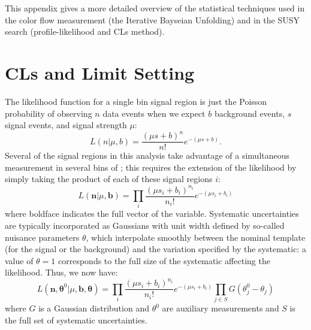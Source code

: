 \label{appendix:statistics}

This appendix gives a more detailed overview of the statistical techniques used in the color flow measurement (the Iterative Bayseian Unfolding) and in the SUSY search (profile-likelihood and CLs method).

\section{CLs and Limit Setting}


The likelihood function for a single bin signal region is just the Poisson probability of observing $n$ data events when we expect $b$ background events, $s$ signal events, and signal strength $\mu$:
%
\begin{equation}
L(n|\mu,b) = \frac{(\mu s + b)^n}{n!} e^{-(\mu s + b)}.
\end{equation}
%
Several of the signal regions in this analysis take advantage of a simultaneous measurement in several bins of \MJ; this requires the extension of the likelihood by simply taking the product of each of these signal regions $i$:
%
\begin{equation}
L(\boldsymbol{n}|\mu,\boldsymbol{b}) = \prod_i \frac{(\mu s_i + b_i)^{n_i}}{n_i!} e^{-(\mu s_i + b_i)}
\end{equation}
%
where boldface indicates the full vector of the variable. Systematic uncertainties are typically incorporated as Gaussians with unit width defined by so-called nuisance parameters $\theta$, which interpolate smoothly between the nominal template (for the signal or the background) and the variation specified by the systematic: a value of $\theta = 1$ corresponds to the full size of the systematic affecting the likelihood. Thus, we now have:
%
\begin{equation}
L(\boldsymbol{n}, \boldsymbol{\theta}^0 |\mu,\boldsymbol{b},\boldsymbol{\theta}) = \prod_i \frac{(\mu s_i + b_i)^{n_i}}{n_i!} e^{-(\mu s_i + b_i)} \prod_{j \in S} G(\theta^0_j - \theta_j )
\end{equation}
%
where $G$ is a Gaussian distribution and $\theta^0$ are auxiliary measurements and $S$ is the full set of systematic uncertainties.

